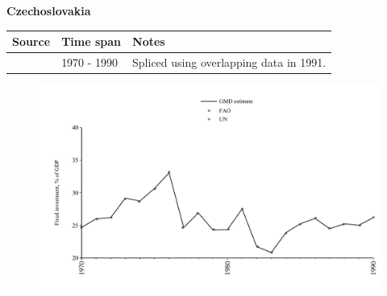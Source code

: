 \documentclass[12pt,a4paper,landscape]{article}
\begin{document}
\begin{adjustbox}{max totalsize={\paperwidth}{\paperheight},center}
\begin{minipage}[t][\textheight][t]{\textwidth}
\vspace*{0.5cm}
{}
\begin{center}
{\Large\bfseries Czechoslovakia}
\end{center}
\vspace{0.5cm}
\begin{table}[H]
\centering
\small
\begin{tabular}{|l|l|l|}
\hline
\textbf{Source} & \textbf{Time span} & \textbf{Notes} \\
\hline
\rowcolor{white}\cite{UN}& 1970 - 1990 &Spliced using overlapping data in 1991.\\
\hline
\end{tabular}
\end{table}
\begin{figure}[H]
\centering
\includegraphics[width=\textwidth,height=0.6\textheight,keepaspectratio]{graphs/CSK_finv_GDP.pdf}
\end{figure}
\end{minipage}
\end{adjustbox}
\end{document}
